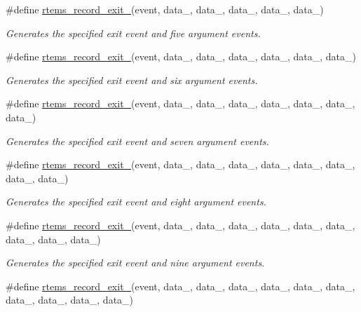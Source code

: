 \begin{DoxyCompactItemize}
\#define \mbox{\hyperlink{group__RTEMSRecord_gaff8483722f55e7f9008b5f4126faa8f7}{rtems\+\_\+record\+\_\+exit\+\_}}(event,  data\+\_,  data\+\_,  data\+\_,  data\+\_,  data\+\_)
\begin{DoxyCompactList}\small\item\em Generates the specified exit event and five argument events. \end{DoxyCompactList}\item 
\#define \mbox{\hyperlink{group__RTEMSRecord_gac811e6f235eae940221c84487531330d}{rtems\+\_\+record\+\_\+exit\+\_}}(event,  data\+\_,  data\+\_,  data\+\_,  data\+\_,  data\+\_,  data\+\_)
\begin{DoxyCompactList}\small\item\em Generates the specified exit event and six argument events. \end{DoxyCompactList}\item 
\#define \mbox{\hyperlink{group__RTEMSRecord_gac48ded8a175477d5509ea64ca5b77098}{rtems\+\_\+record\+\_\+exit\+\_}}(event,  data\+\_,  data\+\_,  data\+\_,  data\+\_,  data\+\_,  data\+\_,  data\+\_)
\begin{DoxyCompactList}\small\item\em Generates the specified exit event and seven argument events. \end{DoxyCompactList}\item 
\#define \mbox{\hyperlink{group__RTEMSRecord_ga47a88394651dd48162a399b9bd2805c9}{rtems\+\_\+record\+\_\+exit\+\_}}(event,  data\+\_,  data\+\_,  data\+\_,  data\+\_,  data\+\_,  data\+\_,  data\+\_,  data\+\_)
\begin{DoxyCompactList}\small\item\em Generates the specified exit event and eight argument events. \end{DoxyCompactList}\item 
\#define \mbox{\hyperlink{group__RTEMSRecord_ga7d543539d7f9d69cb780aae0a94cc1ac}{rtems\+\_\+record\+\_\+exit\+\_}}(event,  data\+\_,  data\+\_,  data\+\_,  data\+\_,  data\+\_,  data\+\_,  data\+\_,  data\+\_,  data\+\_)
\begin{DoxyCompactList}\small\item\em Generates the specified exit event and nine argument events. \end{DoxyCompactList}\item 
\#define \mbox{\hyperlink{group__RTEMSRecord_ga142c04afa5d6ad11948d92077d57b0d5}{rtems\+\_\+record\+\_\+exit\+\_}}(event,  data\+\_,  data\+\_,  data\+\_,  data\+\_,  data\+\_,  data\+\_,  data\+\_,  data\+\_,  data\+\_,  data\+\_)

\end{DoxyCompactItemize}
